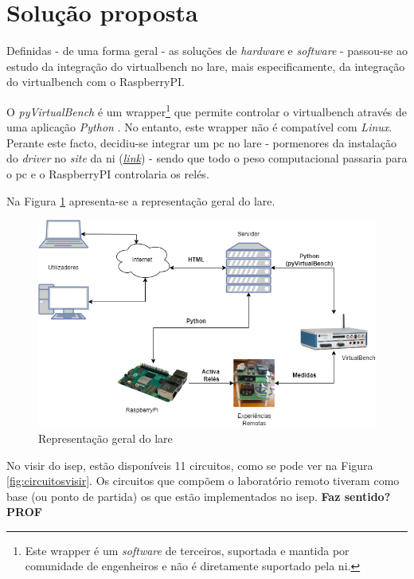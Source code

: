 \section{Solução proposta}
\label{sec:solucaoproposta}
Definidas - de uma forma geral - as soluções de \textit{hardware} e \textit{software} - passou-se ao estudo da integração do \acrshort{virtualbench} no \acrshort{lare}, mais especificamente, da integração do \acrshort{virtualbench} com o \gls{RaspberryPI}. 

O \textit{pyVirtualBench} é um \gls{wrapper}\footnote{Este \gls{wrapper} é um \textit{software} de terceiros, suportada e mantida por comunidade de engenheiros e não é diretamente suportado pela \acrshort{ni}.} que permite controlar o \acrshort{virtualbench} através de uma aplicação \textit{Python} \cite{pyvirtualbench}. No entanto, este \gls{wrapper} não é compatível com \textit{Linux}. 
Perante este facto, decidiu-se integrar um \acrshort{pc} no \acrshort{lare} - pormenores da instalação do \textit{driver} no \textit{site} da \acrshort{ni} (\href{https://knowledge.ni.com/KnowledgeArticleDetails?id=kA00Z000000kHUFSA2&l=pt-PT}{\textit{link}}) - sendo que todo o peso computacional passaria para o \acrshort{pc} e o \gls{RaspberryPI} controlaria os relés. 

Na Figura \ref{fig:representaçãogerallare} apresenta-se a representação geral do \acrshort{lare}.

\begin{figure}[hbtp]
    \centering
    \includegraphics[width=1\textwidth]{figures/arquitectura_ver2.drawio.png}
    \caption{Representação geral do \acrshort{lare}}
    \label{fig:representaçãogerallare}
\end{figure}

No \acrshort{visir} do \acrshort{isep}, estão disponíveis 11 circuitos, como se pode ver na Figura \ref{fig:circuitosvisir}. Os circuitos que compõem o \acrshort{laboratório remoto} tiveram como base (ou ponto de partida) os que estão implementados no \acrshort{isep}. \textbf{Faz sentido? PROF}

